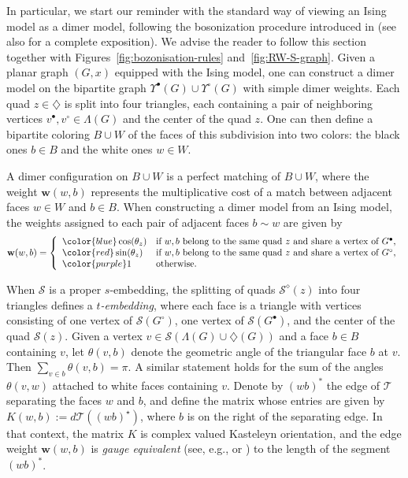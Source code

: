 \documentclass[reqno]{amsart}
\numberwithin{equation}{section}
\theoremstyle{definition}
\theoremstyle{remark}
\newcommand\cS{\mathcal{S}}
\newcommand\cT{\mathcal{T}}
\begin{document}
In particular, we start our reminder with the standard way of viewing an Ising model as a dimer model, following the bosonization procedure introduced in \cite{Dubedat-bos} (see also \cite[Section~2.3.3]{deTiliere18} for a complete exposition). We advise the reader to follow this section together with Figures~\ref{fig:bozonisation-rules} and~\ref{fig:RW-S-graph}. Given a planar graph $(G,x)$ equipped with the Ising model, one can construct a dimer model on the bipartite graph $\Upsilon^{\bullet}(G) \cup \Upsilon^{\circ}(G)$ with simple dimer weights. Each quad $z \in \diamondsuit$ is split into four triangles, each containing a pair of neighboring vertices $v^{\bullet},v^{\circ} \in \Lambda(G)$ and the center of the quad $z$. One can then define a bipartite coloring $B \cup W$ of the faces of this subdivision into two colors: the black ones $b \in B$ and the white ones $w \in W$. 

A dimer configuration on $B \cup W$ is a perfect matching of $B \cup W$, where the weight $\mathbf{w}(w,b)$ represents the multiplicative cost of a match between adjacent faces $w \in W$ and $b \in B$. When constructing a dimer model from an Ising model, the weights assigned to each pair of adjacent faces $b \sim w$ are given by
$$
\mathbf{w}(w,b) = 
\left\{
    \begin{array}{ll}
        \color{blue}\cos(\theta_z) & \text{if } w,b \text{ belong to the same quad } z \text{ and share a vertex of } G^{\bullet}, \\
        \color{red}\sin(\theta_z) & \text{if } w,b \text{ belong to the same quad } z \text{ and share a vertex of } G^{\circ}, \\
        \color{purple}1 & \text{otherwise.}
    \end{array}
\right.
$$

When $\cS$ is a proper $s$-embedding, the splitting of quads $\cS^\diamond(z)$ into four triangles defines a \emph{$t$-embedding}, where each face is a triangle with vertices consisting of one vertex of $\cS(G^{\circ})$, one vertex of $\cS(G^{\bullet})$, and the center of the quad $\cS(z)$. Given a vertex $v \in \cS(\Lambda(G) \cup \diamondsuit(G))$ and a face $b \in B$ containing $v$, let $\theta(v,b)$ denote the geometric angle of the triangular face $b$ at $v$. Then $\sum_{v \in b} \theta(v,b) = \pi$. A similar statement holds for the sum of the angles $\theta(v,w)$ attached to white faces containing $v$. Denote by $(wb)^*$ the edge of $\cT$ separating the faces $w$ and $b$, and define the matrix whose entries are given by $K(w,b):= d\cT((wb)^\star)$, where $b$ is on the right of the separating edge. In that context, the matrix $K$ is complex valued Kasteleyn orientation, and the edge weight $\mathbf{w}(w,b)$ is \emph{gauge equivalent} (see, e.g., \cite[Section~7]{KLRR} or \cite[Section~8.2]{CLR1}) to the length of the segment $(wb)^*$.
\end{document}
